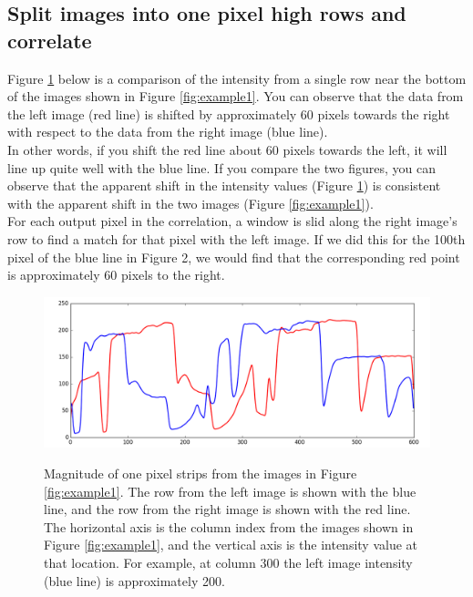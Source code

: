 \documentclass[11pt,fleqn]{article}
\begin{document}
\subsection{Split images into one pixel high rows and correlate}

Figure \ref{fig:strips} below is a comparison of the intensity from a single row near the bottom of the images shown in Figure \ref{fig:example1}. You can observe that the data from the left image (red line) is shifted by approximately 60 pixels towards the right with respect to the data from the right image (blue line).\\[5pt]
%
In other words, if you shift the red line about 60 pixels towards the left, it will line up quite well with the blue line. If you compare the two figures, you can observe that the apparent shift in the intensity values (Figure \ref{fig:strips}) is consistent with the apparent shift in the two images (Figure \ref{fig:example1}). \\[5pt]
%
For each output pixel in the correlation, a window is slid along the right image's row to find a match for that pixel with the left image. If we did this for the 100th pixel of the blue line in Figure 2, we would find that the corresponding red point is approximately 60 pixels to the right.\\

\begin{figure}[!h]
\begin{mdframed}
\centering
\includegraphics[width=1\textwidth]{images/strips.png} \\[2pt]
\caption[Intensity of the one pixel strips taken from the images in Figure \ref{fig:example1}]{Magnitude of one pixel strips from the images in Figure \ref{fig:example1}. The row from the left image is shown with the blue line, and the row from the right image is shown with the red line. The horizontal axis is the column index from the images shown in Figure \ref{fig:example1}, and the vertical axis is the intensity value at that location. For example, at column 300 the left image intensity (blue line) is approximately 200.}
\label{fig:strips}
\end{mdframed}
\end{figure}
\end{document}
